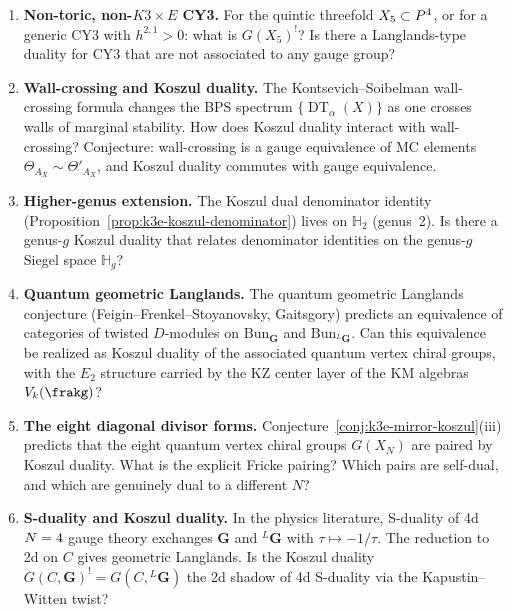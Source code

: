 \documentclass[11pt]{article}
\theoremstyle{definition}
\theoremstyle{remark}
\DeclareMathOperator{\DT}{DT}
\newcommand{\bH}{\mathbb{H}}
\begin{document}
\begin{enumerate}[label=\textbf{Q\arabic*.}]
\item \textbf{Non-toric, non-$K3 \times E$ CY3.}
For the quintic threefold $X_5 \subset P^4$, or for a generic CY3
with $h^{2,1} > 0$: what is $G(X_5)^!$? Is there a Langlands-type
duality for CY3 that are not associated to any gauge group?

\item \textbf{Wall-crossing and Koszul duality.}
The Kontsevich--Soibelman wall-crossing formula changes the BPS
spectrum $\{\DT_\alpha(X)\}$ as one crosses walls of marginal
stability. How does Koszul duality interact with wall-crossing?
Conjecture: wall-crossing is a gauge equivalence of MC elements
$\Theta_{A_X} \sim \Theta'_{A_X}$, and Koszul duality commutes with
gauge equivalence.

\item \textbf{Higher-genus extension.}
The Koszul dual denominator identity
(Proposition~\ref{prop:k3e-koszul-denominator}) lives on $\bH_2$
(genus~2). Is there a genus-$g$ Koszul duality that relates
denominator identities on the genus-$g$ Siegel space $\bH_g$?

\item \textbf{Quantum geometric Langlands.}
The quantum geometric Langlands conjecture
(Feigin--Frenkel--Stoyanovsky, Gaitsgory) predicts an equivalence
of categories of twisted $D$-modules on $\mathrm{Bun}_\mathbf{G}$
and $\mathrm{Bun}_{{}^L\mathbf{G}}$. Can this equivalence be
realized as Koszul duality of the associated quantum vertex chiral
groups, with the $E_2$ structure carried by the KZ center layer of the
KM algebras $V_k(\frakg)$?

\item \textbf{The eight diagonal divisor forms.}
Conjecture~\ref{conj:k3e-mirror-koszul}(iii) predicts that the
eight quantum vertex chiral groups $G(X_N)$ are paired by Koszul
duality. What is the explicit Fricke pairing? Which pairs are
self-dual, and which are genuinely dual to a different $N$?

\item \textbf{S-duality and Koszul duality.}
In the physics literature, S-duality of 4d $N = 4$ gauge theory
exchanges $\mathbf{G}$ and ${}^L\mathbf{G}$ with
$\tau \mapsto -1/\tau$. The reduction to 2d on $C$ gives geometric
Langlands. Is the Koszul duality
$G(C, \mathbf{G})^! = G(C, {}^L\mathbf{G})$ the 2d shadow of 4d
S-duality via the Kapustin--Witten twist?
\end{enumerate}
\end{document}
